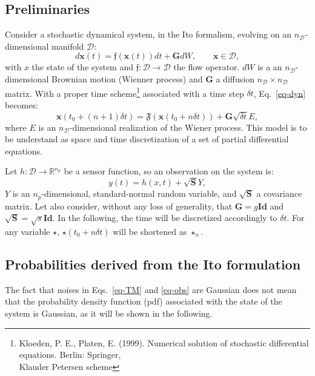 \documentclass[aip,pof,nofootinbib,reprint,onecolumn]{revtex4-1}
\newcommand{\gras}[1]{\boldsymbol{#1}}
\newcommand{\mypar}[1]{\left(#1\right)}
\newcommand{\Ephaz}{\mathcal{D}}%
\newcommand{\Nphaz}{n_{\mathcal{D}}} %
\newcommand{\Nm}{n_p} %
\newcommand{\flot}{\mathfrak{f}} %
\newcommand{\fint}{\mathfrak{F}} %
\newcommand{\obs}{y} %
\newcommand{\point}{\gras{x}} %
\begin{document}
\subsection{Preliminaries}
Consider a stochastic dynamical system, in the Ito formalism, evolving on an $\Nphaz$-dimensional manifold $\Ephaz$:
\begin{equation}
d \point\mypar{t} = \flot\mypar{\point\mypar{t}}dt + \gras{G}dW, \qquad \point \in \Ephaz,
\label{eq-dyn}
\end{equation}
with $x$ the state of the system and $\flot:\Ephaz \rightarrow \Ephaz$ the flow operator. $dW$ is a an $\Nphaz$-dimensional Brownian motion (Wienner process) and $\gras{G}$ a diffusion $\Nphaz\times \Nphaz$ matrix.
With a proper time scheme\footnote{Kloeden, P. E.,  Platen, E. (1999). Numerical solution of stochastic differential equations. Berlin:
Springer,\\ Klauder Petersen scheme} associated with a time step $\delta t$, Eq.~\eqref{eq-dyn}  becomes:
\begin{equation}
\point\mypar{t_0+\mypar{n+1}\delta t} =  \fint\mypar{\point\mypar{t_0+n\delta t}}+\gras{G}\sqrt{\delta t} E,
\label{eq-TM}
\end{equation}
where $E$ is an $\Nphaz$-dimensional realization of the Wiener process. 
This model is to be understand as space and time discretization of a set of partial differential equations.

Let $h:\Ephaz \rightarrow \mathbb{R}^{\Nm}$ be a sensor function, so an observation on the system is:
\begin{equation}
 \obs(t) = h\mypar{x,t} + \sqrt{\gras{S}}Y,
\label{eq-obs}
\end{equation}
$Y$ is an $\Nm$-dimensional, standard-normal random variable, and $\sqrt{\gras{S}}$ a covariance matrix. 
Let also consider, without any loss of generality, that $\gras{G} = g \gras{Id}$ and $\sqrt{\gras{S}} = \sqrt{s} \gras{Id}$.
In the following, the time will be discretized accordingly to $\delta t$. For any variable $\star$, $ \star\mypar{t_0+n\delta t}$ will be shortened as $ \star_n$.





\subsection{Probabilities derived from the Ito formulation}
The fact that noises in Eqs.~\eqref{eq-TM} and \eqref{eq-obs} are Gaussian does not mean that the probability density function (pdf) associated with the state of the system is Gaussian, as it will be shown in the following.
\end{document}

